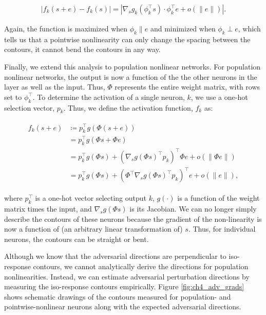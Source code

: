 \begin{equation}
\begin{split}
    |f_{k}(s+e) - f_{k}(s)| = |\nabla_{s}g_{k}(\phi_{k}^\top s) \cdot \phi_{k}^\top e + o(\|e\|)|.
\end{split}
\end{equation}

Again, the function is maximized when $\phi_{k} \parallel e$ and minimized when $\phi_{k} \perp e$, which tells us that a pointwise nonlinearity can only change the spacing between the contours, it cannot bend the contours in any way.

Finally, we extend this analysis to population nonlinear networks.
For population nonlinear networks, the output is now a function of the the other neurons in the layer as well as the input.
Thus, $\Phi$ represents the entire weight matrix, with rows set to $\phi_{k}^\top$.
To determine the activation of a single neuron, $k$, we use a one-hot selection vector, $p_{k}$.
Thus, we define the activation function, $f_{k}$ as:

\begin{align}\label{eq:pop_nonlinear}
\begin{split}
   f_{k}(s+e) &\coloneqq p_{k}^\top g(\Phi(s+e)) \\
   &= p_{k}^\top g(\Phi s + \Phi e) \\
   &= p_{k}^\top g(\Phi s) + (\nabla_{s}g(\Phi s)^\top p_{k})^\top \Phi e + o(\|\Phi e\|) \\
   &= p_{k}^\top g(\Phi s) + (\Phi^\top \nabla_{s}g(\Phi s)^\top p_{k})^\top e + o(\|e\|),
\end{split}
\end{align}

where $p_{k}^\top$ is a one-hot vector selecting output $k$, $g(\cdot)$ is a function of the weight matrix times the input, and $\nabla_{s}g(\Phi s)$ is its Jacobian.
We can no longer simply describe the contours of these neurons because the gradient of the non-linearity is now a function of (an arbitrary linear transformation of) $s$.
Thus, for individual neurons, the contours can be straight or bent.

Although we know that the adversarial directions are perpendicular to iso-response contours, we cannot analytically derive the directions for population nonlinearities.
Instead, we can estimate adversarial perturbation directions by measuring the iso-response contours empirically.
Figure \ref{fig:ch4_adv_grads} shows schematic drawings of the contours measured for population- and pointwise-nonlinear neurons along with the expected adversarial directions.

